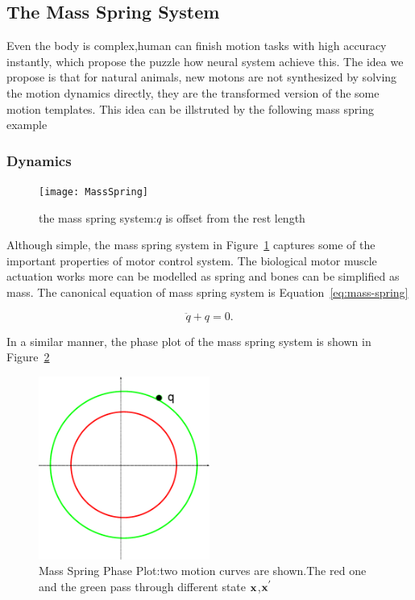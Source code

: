 \subsection{The Mass Spring System}
Even the body is complex,human can finish motion tasks with high accuracy instantly, which propose the puzzle how neural system achieve this.
The idea we propose  is that for natural animals,  new motons are not synthesized by solving the  motion dynamics directly, they are the transformed version of the some motion templates.
 This idea can be  illstruted by the following mass spring example

\subsubsection*{Dynamics}
\begin{figure}[!htbp]
  \begin{center}
    \texttt{[image: MassSpring]}
    \caption{the mass spring system:$q$ is offset from the rest length}
    \label{fig:massspring}
  \end{center}
\end{figure}


Although simple, the mass spring system in Figure~\ref{fig:massspring} captures some of the important properties of motor control system.
The biological motor muscle actuation works more can be modelled as spring and bones can be simplified as mass.
The canonical equation of mass spring system is Equation~\ref{eq:mass-spring}

\begin{equation}
\label{eq:mass-spring}
\ddot{q}+q=0.
\end{equation}

In a similar manner,  the phase plot of the mass spring system is shown in Figure~\ref{fig:massSpringPhasePlot}


\begin{figure}[!htbp]
  \begin{center}
      \includegraphics[width=0.5\textwidth]{MassSpringPhasePlot}
    \caption{Mass Spring Phase Plot:two motion curves are shown.The red one and the green pass through different state $\mathbf{x}$,$\mathbf{x}^{'}$}
    \label{fig:massSpringPhasePlot}
  \end{center}
\end{figure}

